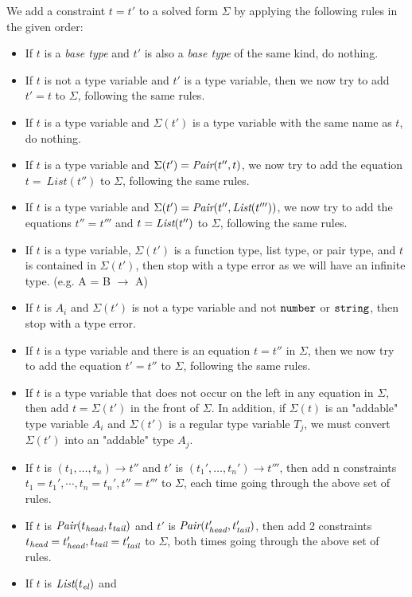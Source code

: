We add a constraint $t = t'$ to a solved form $\Sigma$ by applying the following rules
in the given order:
\begin{itemize}
\item If $t$ is a \emph{base type} and $t'$ is also a \emph{base type} of the same kind, do nothing.
\item If $t$ is not a type variable and $t'$ is a type variable, then we now try to add $t' = t$ to
$\Sigma$, following the same rules.
\item If $t$ is a type variable and $\Sigma(t')$ is a type variable with the same name as $t$, do nothing.
\item If $t$ is a type variable and $\Sigma(t')=\textit{Pair}(t'', t)$, we now try to add the equation $t =\ List(t'')$ to $\Sigma$, following the same rules.
\item If $t$ is a type variable and $\Sigma(t')=\textit{Pair}(t'', \textit{List}(t'''))$, we now try to add the equations $t''=t'''$ and $t=\textit{List}(t'')$ to $\Sigma$, following the same rules. 
\item If $t$ is a type variable, $\Sigma(t')$ is a function type, list type, or pair type, and $t$ is contained in $\Sigma(t')$, then stop
  with a type error as we will have an infinite type. (e.g. A = B $\rightarrow$ A)
\item If $t$ is $A_i$ and $\Sigma(t')$ is not a type variable and not $\texttt{number}$ or $\texttt{string}$,
  then stop with a type error.
\item If $t$ is a type variable and there is an equation $t = t''$ in $\Sigma$, then
  we now try to add the equation $t' = t''$ to $\Sigma$, following the same rules.
\item If $t$ is a type variable that does not occur on the left in any equation in $\Sigma$,
  then add $t = \Sigma(t')$ in the front of $\Sigma$. In addition, if $\Sigma(t)$ is an "addable"
  type variable $A_i$ and $\Sigma(t')$ is a regular type variable $T_j$, we must convert $\Sigma(t')$
  into an "addable" type $A_j$.  
\item If $t$ is $(t_1,\ldots, t_n) \rightarrow t''$ and
  $t'$ is $(t_1',\ldots, t_n') \rightarrow t'''$, then add n constraints
  $t_1 = t_1', \cdots, t_n = t_n', t'' = t'''$ to $\Sigma$, each time going through the above set of rules.
\item If $t$ is $\textit{Pair}(t_{\textit{head}},t_{\textit{tail}})$ and
  $t'$ is $\textit{Pair}(t_{\textit{head}} ',t_{\textit{tail}} ')$, then add 2 constraints
  $t_{\textit{head}} = t_{\textit{head}} ', t_{\textit{tail}} = t_{\textit{tail}} '$ to $\Sigma$, both times going through the above set of rules.
\item If $t$ is $\textit{List}(t_\textit{el})$ and

\end{itemize}
